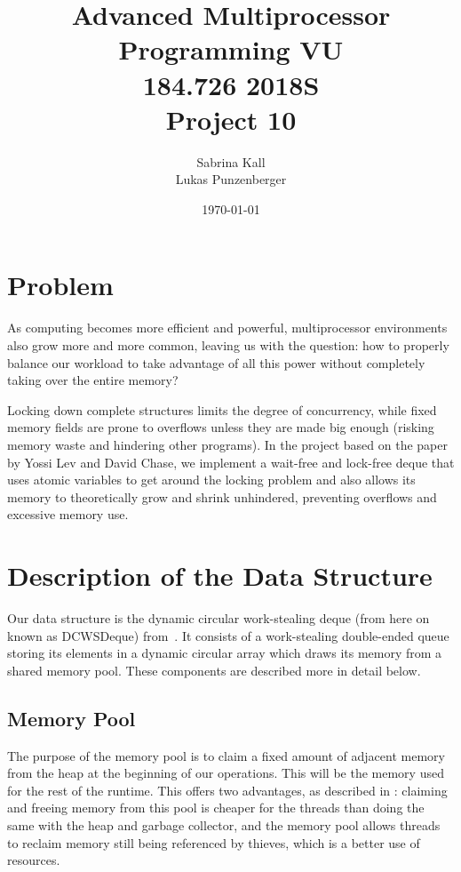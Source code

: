 \documentclass [10pt]{scrartcl}
\title{Advanced Multiprocessor Programming VU\\ 
   184.726 2018S \\
   Project 10 }
\author{Sabrina Kall \\Lukas Punzenberger}
\date{\today}
\begin{document}
   \newcommand{\picWidth}{.7\textwidth}
   \maketitle
   \pagebreak
   \tableofcontents
   \newpage
   
   \section{Problem}
   As computing becomes more efficient and powerful, multiprocessor environments also grow more and more common, leaving us with the question: how to properly balance our workload to take advantage of all this power without completely taking over the entire memory?
   
   Locking down complete structures limits the degree of concurrency, while fixed memory fields are prone to overflows unless they are made big enough (risking memory waste and hindering other programs). In the project based on the paper~\cite{DCWS} by Yossi Lev and David Chase, we implement a wait-free and lock-free deque that uses atomic variables to get around the locking problem and also allows its memory to theoretically grow and shrink unhindered, preventing overflows and excessive memory use.
   
   
   \section{Description of the Data Structure}
   
   Our data structure is the dynamic circular work-stealing deque (from here on known as DCWSDeque) from~\cite{DCWS}. It consists of a work-stealing double-ended queue storing its elements in a dynamic circular array which draws its memory from a shared memory pool. These components are described more in detail below.
   
   \subsection{Memory Pool}
   The purpose of the memory pool is to claim a fixed amount of adjacent memory from the heap at the beginning of our operations.
   This will be the memory used for the rest of the runtime. This offers two advantages, as described in \cite{DCWS}: claiming and freeing memory from this pool is cheaper for the
   threads than doing the same with the heap and garbage collector, and the memory pool allows threads to reclaim memory still being referenced by thieves,
   which is a better use of resources.
   
\end{document}
